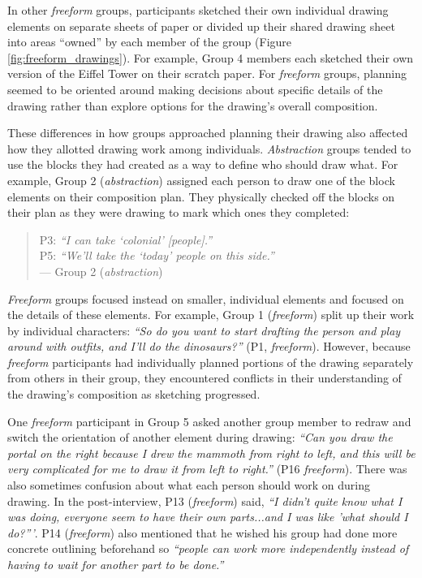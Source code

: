 In other \textit{freeform} groups, participants sketched their own individual drawing elements on separate sheets of paper or divided up their shared drawing sheet into areas ``owned'' by each member of the group (Figure \ref{fig:freeform_drawings}). For example, Group 4 members each sketched their own version of the Eiffel Tower on their scratch paper. 
For \textit{freeform} groups, planning seemed to be oriented around making decisions about specific details of the drawing rather than explore options for the drawing's overall composition.

These differences in how groups approached planning their drawing also affected how they allotted drawing work among individuals. \textit{Abstraction} groups tended to use the blocks they had created as a way to define who should draw what. For example, Group 2 (\textit{abstraction}) assigned each person to draw one of the block elements on their composition plan. They physically checked off the blocks on their plan as they were drawing to mark which ones they completed:

\begin{quote}
    P3: \textit{``I can take `colonial' [people].''}\\ 
    P5: \textit{``We'll take the `today' people on this side.''}\\
    --- Group 2 (\textit{abstraction})
\end{quote}

\textit{Freeform} groups focused instead on smaller, individual elements and focused on the details of these elements. For example, Group 1 (\textit{freeform}) split up their work by individual characters: \textit{``So do you want to start drafting the person and play around with outfits, and I'll do the dinosaurs?''} (P1, \textit{freeform}). However, because \textit{freeform} participants had individually planned portions of the drawing separately from others in their group, they encountered conflicts in their understanding of the drawing's composition as sketching progressed.

One \textit{freeform} participant in Group 5 asked another group member to redraw and switch the orientation of another element during drawing: \textit{``Can you draw the portal on the right because I drew the mammoth from right to left, and this will be very complicated for me to draw it from left to right.''} (P16 \textit{freeform}). There was also sometimes confusion about what each person should work on during drawing. In the post-interview, P13 (\textit{freeform}) said, \textit{``I didn't quite know what I was doing, everyone seem to have their own parts...and I was like 'what should I do?'''}. P14 (\textit{freeform}) also mentioned that he wished his group had done more concrete outlining beforehand so \textit{``people can work more independently instead of having to wait for another part to be done.''} 

